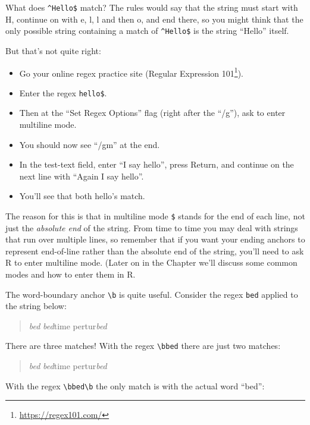 \documentclass[]{book}
\providecommand{\tightlist}{%
  \setlength{\itemsep}{0pt}\setlength{\parskip}{0pt}}
\let\rmarkdownfootnote\footnote%
\def\footnote{\protect\rmarkdownfootnote}
\renewcommand{\href}[2]{#2\footnote{\url{#1}}}
\renewcommand{\href}[2]{#2\footnote{\url{#1}}}
\theoremstyle{definition}
\theoremstyle{definition}
\theoremstyle{definition}
\theoremstyle{remark}
\begin{document}
{What does \texttt{\^{}Hello\$} match? The rules would say that the
string must start with H, continue on with e, l, l and then o, and end
there, so you might think that the only possible string containing a
match of \texttt{\^{}Hello\$} is the string ``Hello'' itself.

But that's not quite right:

\begin{itemize}
\tightlist
\item
  Go your online regex practice site
  (\href{https://regex101.com/}{Regular Expression 101}).
\item
  Enter the regex \texttt{hello\$}.
\item
  Then at the ``Set Regex Options'' flag (right after the ``/g''), ask
  to enter multiline mode.
\item
  You should now see ``/gm'' at the end.
\item
  In the test-text field, enter ``I say hello'', press Return, and
  continue on the next line with ``Again I say hello''.
\item
  You'll see that both hello's match.
\end{itemize}

The reason for this is that in multiline mode \texttt{\$} stands for the
end of each line, not just the \emph{absolute end} 
of the string. From time to time you may deal with strings that run over
multiple lines, so remember that if you want your ending anchors to
represent end-of-line rather than the absolute end of the string, you'll
need to ask R to enter multiline mode. (Later on in the Chapter we'll
discuss some common modes and how to enter them in R.

The word-boundary anchor \texttt{\textbackslash{}b} is quite useful.
Consider the regex \texttt{bed} applied to the string below:

\begin{quote}
\emph{bed} \emph{bed}time pertur\emph{bed}
\end{quote}

There are three matches! With the regex \texttt{\textbackslash{}bbed}
there are just two matches:

\begin{quote}
\emph{bed} \emph{bed}time pertur\emph{bed}
\end{quote}

With the regex \texttt{\textbackslash{}bbed\textbackslash{}b} the only
match is with the actual word ``bed'':

}
\end{document}
